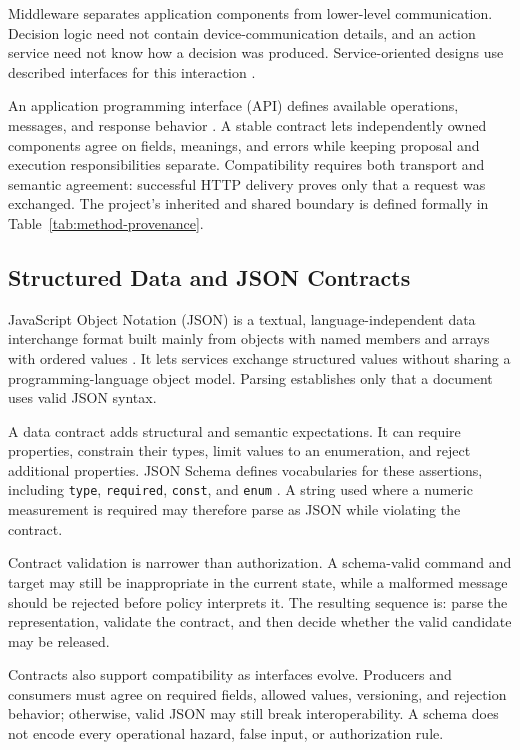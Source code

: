 Middleware separates application components from lower-level communication.
Decision logic need not contain device-communication details, and an action
service need not know how a decision was produced. Service-oriented designs use
described interfaces for this interaction \cite{papazoglou2003serviceoriented}.

An application programming interface (API) defines available operations,
messages, and response behavior \cite{papazoglou2003serviceoriented}. A stable
contract lets independently owned components agree on fields, meanings, and
errors while keeping proposal and execution responsibilities separate.
Compatibility requires both transport and semantic agreement: successful HTTP
delivery proves only that a request was exchanged. The project's inherited and
shared boundary is defined formally in Table~\ref{tab:method-provenance}.

\subsection{Structured Data and JSON Contracts}\label{subsec:theory-json}

JavaScript Object Notation (JSON) is a textual, language-independent data
interchange format built mainly from objects with named members and arrays with
ordered values \cite{bray2017json}. It lets services exchange structured values
without sharing a programming-language object model. Parsing establishes only
that a document uses valid JSON syntax.

A data contract adds structural and semantic expectations. It can require
properties, constrain their types, limit values to an enumeration, and reject
additional properties. JSON Schema defines vocabularies for these assertions,
including \texttt{type}, \texttt{required}, \texttt{const}, and \texttt{enum}
\cite{wright2022jsonschemavalidation}. A string used where a numeric measurement
is required may therefore parse as JSON while violating the contract.

Contract validation is narrower than authorization. A schema-valid command and
target may still be inappropriate in the current state, while a malformed
message should be rejected before policy interprets it. The resulting sequence
is: parse the representation, validate the contract, and then decide whether the
valid candidate may be released.

Contracts also support compatibility as interfaces evolve. Producers and
consumers must agree on required fields, allowed values, versioning, and rejection
behavior; otherwise, valid JSON may still break interoperability. A schema does
not encode every operational hazard, false input, or authorization rule.

